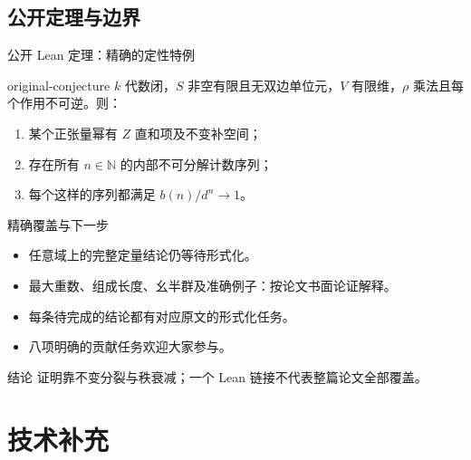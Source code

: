 \documentclass{beamer}
\begin{document}
\subsection{公开定理与边界}
\begin{frame}{公开 Lean 定理：精确的定性特例}
\begin{bookresult}{original-conjecture}
\small
$k$ 代数闭，$S$ 非空有限且无双边单位元，$V$ 有限维，$\rho$ 乘法且每个作用不可逆。则：
\begin{enumerate}
\item 某个正张量幂有 $Z$ 直和项及不变补空间；
\item 存在所有 $n\in\mathbb N$ 的内部不可分解计数序列；
\item 每个这样的序列都满足 $b(n)/d^n\to1$。
\end{enumerate}
\end{bookresult}
\end{frame}
\begin{frame}{精确覆盖与下一步}
\begin{itemize}
\item 任意域上的完整定量结论仍等待形式化。
\item 最大重数、组成长度、幺半群及准确例子：按论文书面论证解释。
\item 每条待完成的结论都有对应原文的形式化任务。
\item 八项明确的贡献任务欢迎大家参与。
\end{itemize}
\begin{alertblock}{结论}
证明靠不变分裂与秩衰减；一个 Lean 链接不代表整篇论文全部覆盖。
\end{alertblock}
\end{frame}
\appendix
\section{技术补充}
\end{document}
